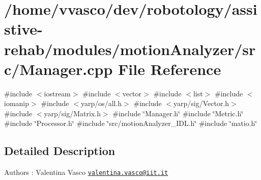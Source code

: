 \section{/home/vvasco/dev/robotology/assistive-\/rehab/modules/motion\+Analyzer/src/\+Manager.cpp File Reference}
\label{Manager_8cpp}
{\ttfamily \#include $<$iostream$>$}\newline
{\ttfamily \#include $<$vector$>$}\newline
{\ttfamily \#include $<$list$>$}\newline
{\ttfamily \#include $<$iomanip$>$}\newline
{\ttfamily \#include $<$yarp/os/all.\+h$>$}\newline
{\ttfamily \#include $<$yarp/sig/\+Vector.\+h$>$}\newline
{\ttfamily \#include $<$yarp/sig/\+Matrix.\+h$>$}\newline
{\ttfamily \#include \char`\"{}Manager.\+h\char`\"{}}\newline
{\ttfamily \#include \char`\"{}Metric.\+h\char`\"{}}\newline
{\ttfamily \#include \char`\"{}Processor.\+h\char`\"{}}\newline
{\ttfamily \#include \char`\"{}src/motion\+Analyzer\+\_\+\+I\+D\+L.\+h\char`\"{}}\newline
{\ttfamily \#include \char`\"{}matio.\+h\char`\"{}}\newline


\subsection{Detailed Description}
\begin{DoxyAuthor}{Authors}
\+: Valentina Vasco \href{mailto:valentina.vasco@iit.it}{\tt valentina.\+vasco@iit.\+it} 
\end{DoxyAuthor}

